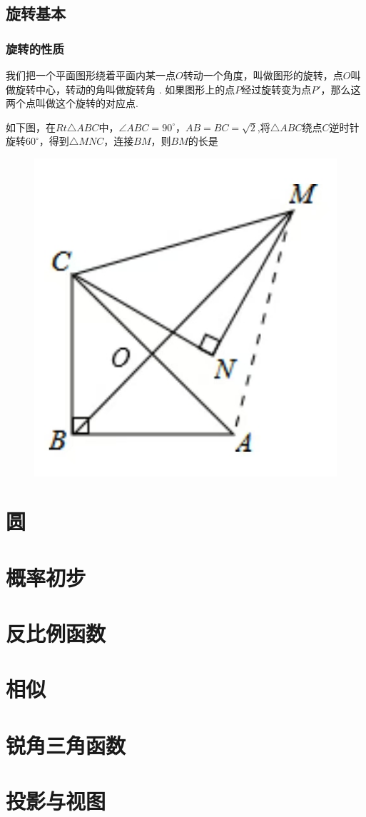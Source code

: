 \documentclass[lang=cn, 10pt, titlestyle=hang, oneside]{elegantbook}
\begin{document}
\section{旋转基本}

\subsection{旋转的性质}

我们把一个平面图形绕着平面内某一点\(O \)转动一个角度，叫做图形的旋转，点\(O \)叫做旋转中心，转动的角叫做旋转角 . 如果图形上的点\(P \)经过旋转变为点\(P' \)，那么这两个点叫做这个旋转的对应点.

\begin{example}
    如下图，在\(Rt\triangle ABC \)中，\(\angle ABC = 90^\circ \)，\(AB=BC=\sqrt{2}\),将\(\triangle ABC\)绕点\(C\)逆时针旋转\(60^\circ\)，得到\(\triangle MNC\)，连接\(BM\)，则\(BM\)的长是 \underline{\hspace{3em}}
    
\begin{figure}[h]
    \raggedright
    \includegraphics[width=0.25\linewidth]{figure/example_rotation1.jpg}
    
    \label{fig:enter-label}
\end{figure}
    
\end{example}



\chapter{圆}

\chapter{概率初步}

\chapter{反比例函数}

\chapter{相似}

\chapter{锐角三角函数}

\chapter{投影与视图}
\end{document}
